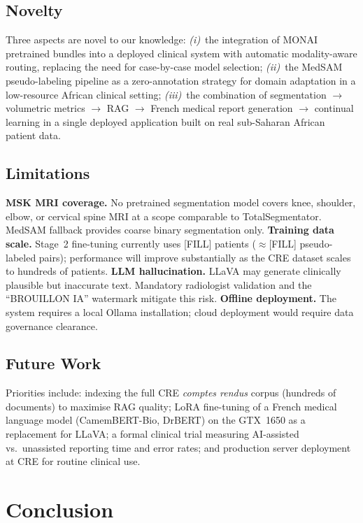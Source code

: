 \documentclass[conference]{IEEEtran}
\begin{document}
\subsection{Novelty}
Three aspects are novel to our knowledge: \textit{(i)}~the integration of MONAI
pretrained bundles into a deployed clinical system with automatic modality-aware
routing, replacing the need for case-by-case model selection; \textit{(ii)}~the
MedSAM pseudo-labeling pipeline as a zero-annotation strategy for domain
adaptation in a low-resource African clinical setting; \textit{(iii)}~the
combination of segmentation $\to$ volumetric metrics $\to$ RAG $\to$ French
medical report generation $\to$ continual learning in a single deployed application
built on real sub-Saharan African patient data.

\subsection{Limitations}
\textbf{MSK MRI coverage.} No pretrained segmentation model covers knee,
shoulder, elbow, or cervical spine MRI at a scope comparable to TotalSegmentator.
MedSAM fallback provides coarse binary segmentation only.
\textbf{Training data scale.} Stage~2 fine-tuning currently uses [FILL] patients
($\approx$[FILL] pseudo-labeled pairs); performance will improve substantially
as the CRE dataset scales to hundreds of patients.
\textbf{LLM hallucination.} LLaVA may generate clinically plausible but
inaccurate text. Mandatory radiologist validation and the ``BROUILLON IA''
watermark mitigate this risk.
\textbf{Offline deployment.} The system requires a local Ollama installation;
cloud deployment would require data governance clearance.

\subsection{Future Work}
Priorities include: indexing the full CRE \textit{comptes rendus} corpus
(hundreds of documents) to maximise RAG quality; LoRA fine-tuning of a French
medical language model (CamemBERT-Bio, DrBERT) on the GTX~1650 as a
replacement for LLaVA; a formal clinical trial measuring AI-assisted vs.\
unassisted reporting time and error rates; and production server deployment
at CRE for routine clinical use.

\section{Conclusion}
\end{document}
